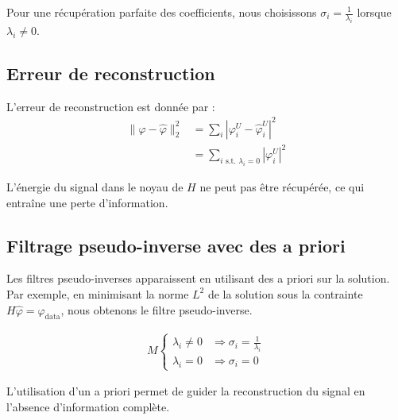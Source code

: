 \documentclass[12pt]{article}
\begin{document}
\begin{tcolorbox}[title={À retenir}]
Pour une récupération parfaite des coefficients, nous choisissons $\sigma_i = \frac{1}{\lambda_i}$ lorsque $\lambda_i \neq 0$.
\end{tcolorbox}

\subsection{Erreur de reconstruction}

L'erreur de reconstruction est donnée par :
\begin{align*}
\|\varphi - \hat{\varphi}\|_2^2 &= \sum_i |\varphi^U_i - \hat{\varphi}^U_i|^2 \\
&= \sum_{i \text{ s.t. } \lambda_i = 0} |\varphi^U_i|^2
\end{align*}

\begin{tcolorbox}[title={Vulgarisation simple}]
L'énergie du signal dans le noyau de $H$ ne peut pas être récupérée, ce qui entraîne une perte d'information.
\end{tcolorbox}

\subsection{Filtrage pseudo-inverse avec des a priori}

Les filtres pseudo-inverses apparaissent en utilisant des a priori sur la solution. Par exemple, en minimisant la norme $L^2$ de la solution sous la contrainte $H\hat{\varphi} = \varphi_{\text{data}}$, nous obtenons le filtre pseudo-inverse.

\begin{align*}
M\begin{cases}
\lambda_i \neq 0 & \Rightarrow \sigma_i = \frac{1}{\lambda_i} \\
\lambda_i = 0 & \Rightarrow \sigma_i = 0
\end{cases}
\end{align*}

\begin{tcolorbox}[title={Intuition}]
L'utilisation d'un a priori permet de guider la reconstruction du signal en l'absence d'information complète.
\end{tcolorbox}
\end{document}

